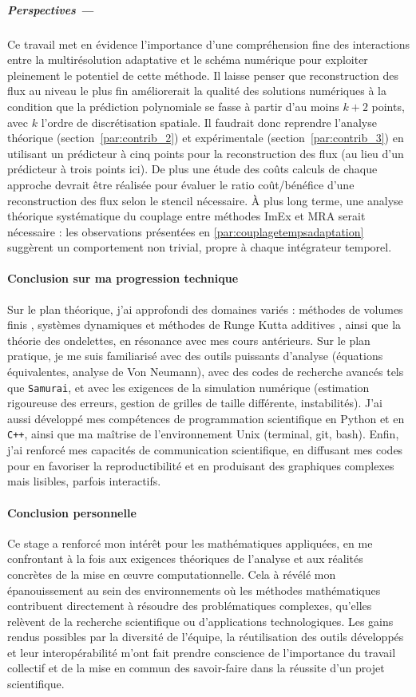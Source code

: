 \medskip
\subparagraph*{Perspectives —}  
Ce travail met en évidence l'importance d'une compréhension fine des interactions 
entre la multirésolution adaptative et le schéma numérique pour exploiter pleinement le potentiel de cette méthode.  
Il laisse penser que reconstruction des flux au niveau le plus fin améliorerait la qualité des solutions numériques à la condition que la prédiction polynomiale 
se fasse à partir d'au moins \(k+2\) points, avec \(k\) l'ordre de discrétisation spatiale.
Il faudrait donc reprendre l'analyse théorique (section~\ref{par:contrib_2}) 
et expérimentale (section~\ref{par:contrib_3}) en utilisant un prédicteur à cinq points pour la reconstruction des flux (au lieu d'un prédicteur à trois points ici).
De plus une étude des coûts calculs de chaque approche devrait être réalisée
pour évaluer le ratio coût/bénéfice d'une reconstruction des flux selon le stencil nécessaire.
À plus long terme, une analyse théorique systématique du couplage entre méthodes ImEx et MRA serait nécessaire : les observations présentées en \ref{par:couplagetempsadaptation} suggèrent un comportement non trivial, propre à chaque intégrateur temporel.

\paragraph*{Conclusion sur ma progression technique}\label{par:cc2}
Sur le plan théorique, j'ai approfondi des domaines variés : méthodes de volumes finis \cite{LeVeque1990}, systèmes dynamiques et méthodes de Runge Kutta additives \cite{HairerAndWanner1}, ainsi que la théorie des ondelettes, en résonance avec mes cours antérieurs.
Sur le plan pratique, je me suis familiarisé avec des outils puissants d'analyse (équations équivalentes, analyse de Von Neumann), avec des codes de recherche avancés tels que \texttt{Samurai}, et avec les exigences de la simulation numérique (estimation rigoureuse des erreurs, gestion de grilles de taille différente, instabilités).
J'ai aussi développé mes compétences de programmation scientifique en Python et en \texttt{C++}, ainsi que ma maîtrise de l'environnement Unix (terminal, git, bash).
Enfin, j'ai renforcé mes capacités de communication scientifique, en diffusant mes codes pour en favoriser la reproductibilité et en produisant des graphiques complexes mais lisibles, parfois interactifs.
\paragraph*{Conclusion personnelle}\label{par:cc3}
Ce stage a renforcé mon intérêt pour les mathématiques appliquées, 
en me confrontant à la fois aux exigences théoriques de l'analyse et aux réalités concrètes de la mise en œuvre computationnelle.
Cela à révélé mon épanouissement au sein des environnements où les méthodes mathématiques contribuent directement à résoudre des problématiques complexes, 
qu'elles relèvent de la recherche scientifique ou d'applications technologiques.
Les gains rendus possibles par la diversité de l'équipe, 
la réutilisation des outils développés et leur interopérabilité m'ont fait prendre conscience
de l'importance du travail collectif et de la mise en commun des savoir-faire dans la réussite d'un projet scientifique.